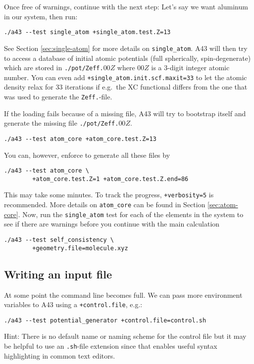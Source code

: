 \documentclass[oribibl]{llncs}
\newcommand{\ttt}[1]{\texttt{#1}}
\newcommand{\codename}{A43}
\begin{document}
\noindent
Once free of warnings, continue with the next step:
Let's say we want aluminum in our system, then run:
\begin{verbatim}
./a43 --test single_atom +single_atom.test.Z=13
\end{verbatim}
See Section \ref{sec:single-atom} for more details on \ttt{single\_atom}.
%
\codename{} will then try to access a database of initial atomic potentials
(full spherically, spin-degenerate) which are stored in \ttt{./pot/Zeff.}$00Z$
where $00Z$ is a 3-digit integer atomic number.
You can even add \ttt{+single\_atom.init.scf.maxit=33} to let the atomic density relax for $33$ iterations if e.g.~the \ac{XC} functional differs from the one that was used to generate the \ttt{Zeff.}-file.

\noindent
If the loading fails because of a missing file, 
\codename{} will try to bootstrap itself and generate the missing file \ttt{./pot/Zeff.}$00Z$.
\begin{verbatim}
./a43 --test atom_core +atom_core.test.Z=13
\end{verbatim}
You can, however, enforce to generate all these files by
\begin{verbatim}
./a43 --test atom_core \
        +atom_core.test.Z=1 +atom_core.test.Z.end=86
\end{verbatim}
This may take some minutes. To track the progress, \ttt{+verbosity=5} is recommended.
More details on \ttt{atom\_core} can be found in Section \ref{sec:atom-core}.
\todo[inline]{OpenMP would be good here}
%
\noindent
Now, run the \ttt{single\_atom} test for each of the elements in the system 
to see if there are warnings before you continue with the main calculation
\begin{verbatim}
./a43 --test self_consistency \
        +geometry.file=molecule.xyz
\end{verbatim}
%

%
\subsection{Writing an input file} \label{sec:control-file}
%
At some point the command line becomes full.
We can pass more environment variables to \codename{} using a \ttt{+control.file}, e.g.:
\begin{verbatim}
./a43 --test potential_generator +control.file=control.sh
\end{verbatim}
Hint: There is no default name or naming scheme for the control file 
but it may be helpful to use an \ttt{.sh}-file extension since that
enables useful syntax highlighting in common text editors.
%
%
\end{document}
